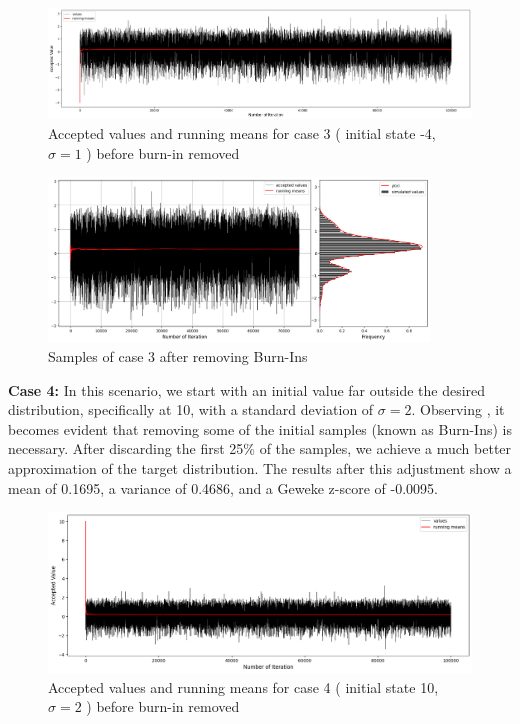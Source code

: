 \begin{example}
    \begin{figure}[H]
        \centering
        \includegraphics[width=1\textwidth]{./images/metropolis/sample-3-values.png}
        \caption{Accepted values and running means for case 3 ( initial state -4, $ \sigma = 1 $ ) before burn-in removed}
        \label{fig:MH sample3}
    \end{figure}

    \begin{figure}[H]
        \centering
        \includegraphics[width=0.9\textwidth]{./images/metropolis/sample-3-value-hist-bo.png}
        \caption{Samples of case 3 after removing Burn-Ins}
        \label{fig:MH sample3 after burn in}
    \end{figure}

    \textbf{Case 4:} In this scenario, we start with an initial value far outside the desired distribution, specifically at 10, with a standard deviation of $\sigma = 2$. Observing , it becomes evident that removing some of the initial samples (known as Burn-Ins) is necessary. After discarding the first 25\% of the samples, we achieve a much better approximation of the target distribution. The results after this adjustment show a mean of 0.1695, a variance of 0.4686, and a Geweke z-score of -0.0095.

    \begin{figure}[H]
        \centering
        \includegraphics[width=1\textwidth]{./images/metropolis/sample-4-values.png}
        \caption{Accepted values and running means for case 4 ( initial state 10, $ \sigma = 2 $ ) before burn-in removed}
        \label{fig:MH sample4}
    \end{figure}


\end{example}
